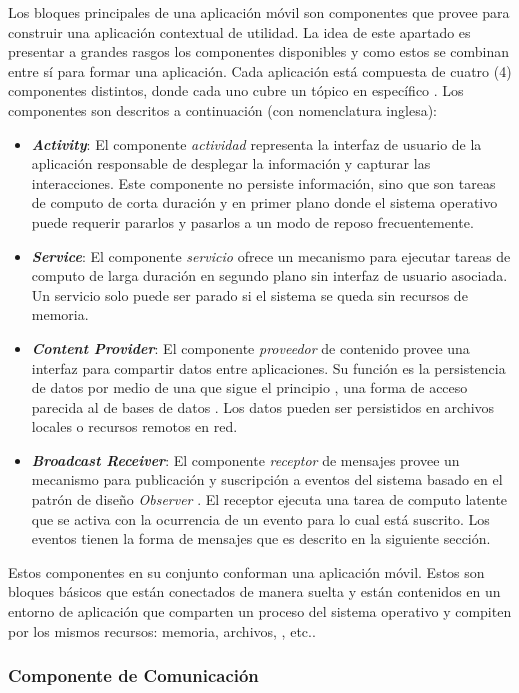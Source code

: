 Los bloques principales de una aplicación móvil son componentes que
 provee para construir una aplicación contextual de
utilidad. La idea de este apartado es presentar a grandes rasgos los
componentes disponibles y como estos se combinan entre sí para formar
una aplicación. Cada aplicación está compuesta de cuatro (4) componentes
distintos, donde cada uno cubre un tópico en específico \cite{Gargenta2014}.
Los componentes son descritos a continuación (con nomenclatura inglesa):
\begin{itemize}
\item \textbf{\emph{Activity}}: El componente \emph{actividad} representa
la interfaz de usuario de la aplicación responsable de desplegar la
información y capturar las interacciones. Este componente no persiste
información, sino que son tareas de computo de corta duración y en
primer plano donde el sistema operativo puede requerir pararlos y
pasarlos a un modo de reposo frecuentemente.
\item \textbf{\emph{Service}}: El componente \emph{servicio} ofrece un mecanismo
para ejecutar tareas de computo de larga duración en segundo plano
sin interfaz de usuario asociada. Un servicio solo puede ser parado
si el sistema se queda sin recursos de memoria.
\item \textbf{\emph{Content Provider}}: El componente \emph{proveedor} de
contenido provee una interfaz para compartir datos entre aplicaciones.
Su función es la persistencia de datos por medio de una 
que sigue el principio , una forma de acceso parecida
al de bases de datos . Los datos pueden ser persistidos
en archivos locales o recursos remotos en red.
\item \textbf{\emph{Broadcast Receiver}}: El componente \emph{receptor}
de mensajes provee un mecanismo para publicación y suscripción a eventos
del sistema basado en el patrón de diseño \emph{Observer} \cite{Shalloway2004}.
El receptor ejecuta una tarea de computo latente que se activa con
la ocurrencia de un evento para lo cual está suscrito. Los eventos
tienen la forma de mensajes que es descrito en la siguiente sección.
\end{itemize}
Estos componentes en su conjunto conforman una aplicación móvil. Estos
son bloques básicos que están conectados de manera suelta y están
contenidos en un entorno de aplicación que comparten un proceso del
sistema operativo y compiten por los mismos recursos: memoria, archivos,
, etc..

\subsubsection{Componente de Comunicación}

